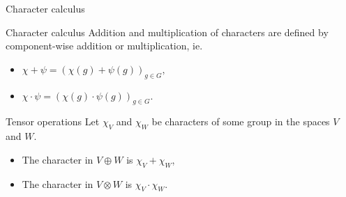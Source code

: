 \documentclass[10pt]{beamer}
\begin{document}
	\begin{frame}{Character calculus}
		\begin{block}{Character calculus}
			Addition and multiplication of characters are defined by component-wise addition or multiplication, ie.\pause
			\begin{itemize}
				\item $\chi + \psi = \left(\chi(g) + \psi(g)\right)_{g \in G},$ \pause
				\item $\chi \cdot \psi = \left(\chi(g) \cdot \psi(g)\right)_{g \in G}$.
			\end{itemize}
		\end{block}\pause
		
		\begin{block}{Tensor operations}
			Let $\chi_V$ and $\chi_W$ be characters of some group in the spaces $V$ and $W$.\pause
			
			\begin{itemize}
				\item The character in $V \oplus W$ is $\chi_V + \chi_W$,\pause
				\item The character in $V \otimes W$ is $\chi_V \cdot \chi_W$.
			\end{itemize}
		\end{block}
	\end{frame}
	
\end{document}

